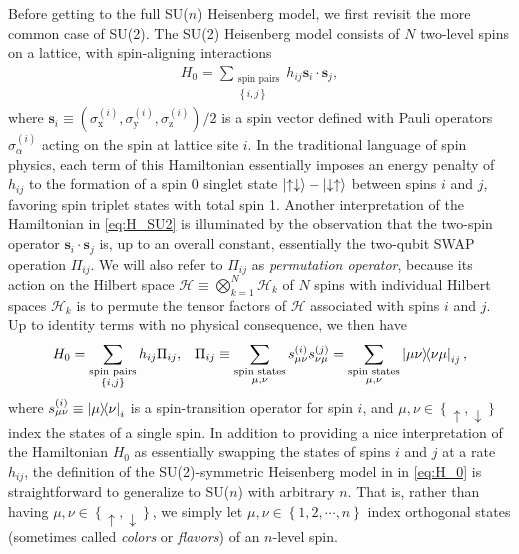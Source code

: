 \documentclass[nofootinbib,notitlepage,11pt]{revtex4-2}
\renewcommand{\t}{\text} %
\newcommand{\p}[1]{\left(#1\right)} %
\renewcommand{\set}[1]{\left\{#1\right\}} %
\renewcommand{\c}{\cdot} %
\newcommand{\m}{\bm} %
\newcommand{\1}{\mathds{1}}
\newcommand{\up}{\uparrow}
\newcommand{\dn}{\downarrow}
\newcommand{\x}{\text{x}}
\newcommand{\y}{\text{y}}
\newcommand{\z}{\text{z}}
\renewcommand{\H}{\mathcal{H}}
\begin{document}
Before getting to the full SU($n$) Heisenberg model, we first revisit
the more common case of SU(2).  The SU(2) Heisenberg model consists of
$N$ two-level spins on a lattice, with spin-aligning interactions
\begin{align}
  H_0 = \sum_{\substack{\t{spin pairs}\\\set{i,j}}}
  h_{ij} \m s_i \c\m s_j,
  \label{eq:H_SU2}
\end{align}
where
$\m s_i\equiv\p{\sigma_\x^{(i)},\sigma_\y^{(i)},\sigma_\z^{(i)}}/2$ is
a spin vector defined with Pauli operators $\sigma_\alpha^{(i)}$
acting on the spin at lattice site $i$.  In the traditional language
of spin physics, each term of this Hamiltonian essentially imposes an
energy penalty of $h_{ij}$ to the formation of a spin 0 singlet state
$\ket{\up\dn}-\ket{\dn\up}$ between spins $i$ and $j$, favoring spin
triplet states with total spin 1.  Another interpretation of the
Hamiltonian in \eqref{eq:H_SU2} is illuminated by the observation that
the two-spin operator $\m s_i\c\m s_j$ is, up to an overall constant,
essentially the two-qubit SWAP operation $\Pi_{ij}$.  We will also
refer to $\Pi_{ij}$ as {\it permutation operator}, because its action
on the Hilbert space $\H\equiv\bigotimes_{k=1}^N\H_k$ of $N$ spins
with individual Hilbert spaces $\H_k$ is to permute the tensor factors
of $\H$ associated with spins $i$ and $j$.  Up to identity terms with
no physical consequence, we then have
\begin{align}
  H_0 = \sum_{\substack{\t{spin pairs}\\\set{i,j}}} h_{ij} \Pi_{ij},
  &&
  \Pi_{ij} \equiv \sum_{\substack{\t{spin states}\\\mu,\nu}}
  s_{\mu\nu}^{(i)} s_{\nu\mu}^{(j)}
  = \sum_{\substack{\t{spin states}\\\mu,\nu}} \op{\mu\nu}{\nu\mu}_{ij},
  \label{eq:H_0}
\end{align}
where $s_{\mu\nu}^{(i)}\equiv\op{\mu}{\nu}_i$ is a spin-transition
operator for spin $i$, and $\mu,\nu\in\set{\up,\dn}$ index the states
of a single spin.  In addition to providing a nice interpretation of
the Hamiltonian $H_0$ as essentially swapping the states of spins $i$
and $j$ at a rate $h_{ij}$, the definition of the SU(2)-symmetric
Heisenberg model in in \eqref{eq:H_0} is straightforward to generalize
to SU($n$) with arbitrary $n$.  That is, rather than having
$\mu,\nu\in\set{\up,\dn}$, we simply let
$\mu,\nu\in\set{1,2,\cdots,n}$ index orthogonal states (sometimes
called {\it colors} or {\it flavors}) of an $n$-level spin.
\end{document}
